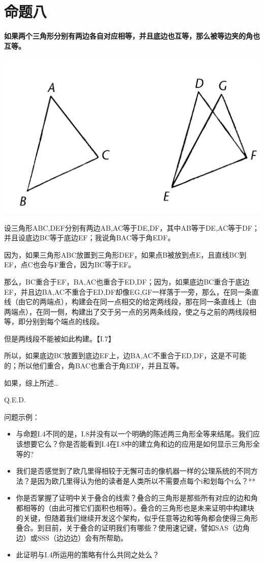 \documentclass[
]{book}
\providecommand{\tightlist}{%
  \setlength{\itemsep}{0pt}\setlength{\parskip}{0pt}}
\begin{document}
\hypertarget{ux547dux9898ux516b}{%
\section{命题八}\label{ux547dux9898ux516b}}

\textbf{如果两个三角形分别有两边各自对应相等，并且底边也互等，那么被等边夹的角也互等。}

\includegraphics[width=0.5\linewidth]{./image/img464}

设三角形ABC,DEF分别有两边AB,AC等于DE,DF，其中AB等于DE,AC等于DF；并且设底边BC等于底边EF；我说角BAC等于角EDF。

因为，如果三角形ABC放置到三角形DEF，如果点B被放到点E，且直线BC到EF，点C也会与F重合，因为BC等于EF。

那么，BC重合于EF，BA,AC也重合于ED,DF；因为，如果底边BC重合于底边EF，并且边BA,AC不重合于ED,DF却像EG,GF一样落于一旁，那么，在同一条直线（由它的两端点），构建会在同一点相交的给定两线段，那在同一条直线上（由两端点），在同一侧，构建出了交于另一点的另两条线段，使之与之前的两线段相等，即分别到每个端点的线段。

但是两线段不能被如此构建。【I.7】

所以，如果底边BC放置到底边EF上，边BA,AC不重合于ED,DF，这是不可能的；所以他们重合，角BAC也重合于角EDF，并且互等。

如果，综上所述\ldots{}

Q.E.D.

问题示例：

\begin{itemize}
\tightlist
\item
  与命题I.4不同的是，I.8并没有以一个明确的陈述两三角形全等来结尾。我们应该想要它么？你是否能看到I.4在I.8中的建立角和边的应用是如何显示三角形全等的?
\item
  我们是否感觉到了欧几里得相较于无懈可击的像机器一样的公理系统的不同方法？是因为欧几里得认为他的读者是人类所以不需要点每个i和划每个t么？**
\item
  你是否掌握了证明中关于叠合的线索？叠合的三角形是那些所有对应的边和角都相等的（由此可推它们面积也相等）。叠合的三角形也是未来证明中构建块的关键，但随着我们继续开发这个架构，似乎任意等边和等角都会使得三角形叠合。到目前，关于叠合的证明我们有哪些？使用速记键，譬如SAS（边角边）或SSS（边边边）会有所帮助。
\item
  此证明与I.4所运用的策略有什么共同之处么？
\end{itemize}
\end{document}
